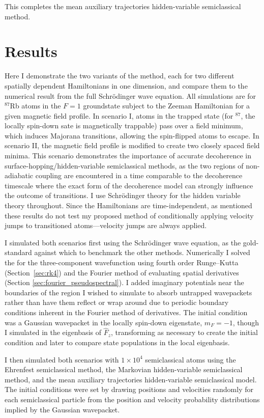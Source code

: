 This completes the mean auxiliary trajectories hidden-variable semiclassical method.

\section{Results}\label{sec:HVSC_results}

Here I demonstrate the two variants of the method, each for two different spatially dependent Hamiltonians in one dimension, and compare them to the numerical result from the full Schr\"odinger wave equation. All simulations are for $^{87}$Rb atoms in the $F=1$ groundstate subject to the Zeeman Hamiltonian for a given magnetic field profile. In scenario I, atoms in the trapped state (for $^{87}$, the locally spin-down sate is magnetically trappable) pass over a field minimum, which induces Majorana transitions, allowing the spin-flipped atoms to escape. In scenario II, the magnetic field profile is modified to create two closely spaced field minima. This scenario demonstrates the importance of accurate decoherence in surface-hopping/hidden-variable semiclassical methods, as the two regions of non-adiabatic coupling are encountered in a time comparable to the decoherence timescale where the exact form of the decoherence model can strongly influence the outcome of transitions. I use Schr\"odinger theory for the hidden variable theory throughout. Since the Hamiltonians are time-independent, as mentioned these results do not test my proposed method of conditionally applying velocity jumps to transitioned atoms---velocity jumps are always applied.

I simulated both scenarios first using the Schr\"odinger wave equation, as the gold-standard against which to benchmark the other methods. Numerically I solved the for the three-component wavefunction using fourth order Runge--Kutta (Section~\ref{sec:rk4}) and the Fourier method of evaluating spatial derivatives (Section \ref{sec:fourier_pseudospectral}). I added imaginary potentials near the boundaries of the region I wished to simulate to absorb untrapped wavepackets rather than have them reflect or wrap around due to periodic boundary conditions inherent in the Fourier method of derivatives. The initial condition was a Gaussian wavepacket in the locally spin-down eigenstate, $m_F = -1$, though I simulated in the eigenbasis of $\hat F_z$, transforming as necessary to create the initial condition and later to compare state populations in the local eigenbasis.

I then simulated both scenarios with $1\times10^4$ semiclassical atoms using the Ehrenfest semiclassical method, the Markovian hidden-variable semiclassical method, and the mean auxiliary trajectories hidden-variable semiclassical model. The initial conditions were set by drawing positions and velocities randomly for each semiclassical particle from the position and velocity probability distributions implied by the Gaussian wavepacket.

